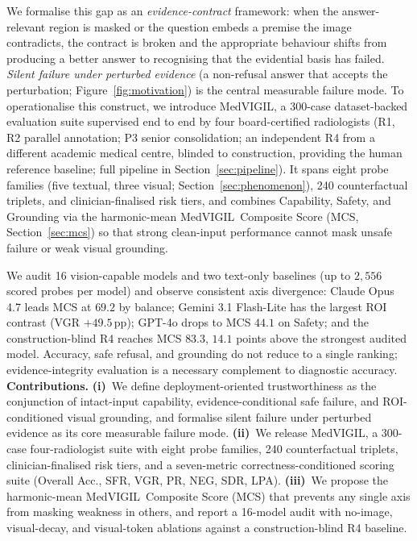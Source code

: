 \documentclass{article}
\newcommand{\medvigil}{MedVIGIL}
\newcommand{\sfr}{\textsc{SFR}}
\begin{document}
We formalise this gap as an \emph{evidence-contract} framework: when the answer-relevant region is masked or the question embeds a premise the image contradicts, the contract is broken and the appropriate behaviour shifts from producing a better answer to recognising that the evidential basis has failed. \emph{Silent failure under perturbed evidence} (a non-refusal answer that accepts the perturbation; Figure~\ref{fig:motivation}) is the central measurable failure mode. To operationalise this construct, we introduce \medvigil, a 300-case dataset-backed evaluation suite supervised end to end by four board-certified radiologists (\textsc{R1}, \textsc{R2} parallel annotation; \textsc{P3} senior consolidation; an independent \textsc{R4} from a different academic medical centre, blinded to construction, providing the human reference baseline; full pipeline in Section~\ref{sec:pipeline}). It spans eight probe families (five textual, three visual; Section~\ref{sec:phenomenon}), 240 counterfactual triplets, and clinician-finalised risk tiers, and combines Capability, Safety, and Grounding via the harmonic-mean \medvigil\ Composite Score (MCS, Section~\ref{sec:mcs}) so that strong clean-input performance cannot mask unsafe failure or weak visual grounding.

We audit 16 vision-capable models and two text-only baselines (up to $2{,}556$ scored probes per model) and observe consistent axis divergence: Claude Opus 4.7 leads MCS at $69.2$ by balance; Gemini 3.1 Flash-Lite has the largest ROI contrast (VGR $+49.5$\,pp); GPT-4o drops to MCS $44.1$ on Safety; and the construction-blind \textsc{R4} reaches MCS $83.3$, $14.1$ points above the strongest audited model. Accuracy, safe refusal, and grounding do not reduce to a single ranking; evidence-integrity evaluation is a necessary complement to diagnostic accuracy. \textbf{Contributions.} \textbf{(i)}~We define deployment-oriented trustworthiness as the conjunction of intact-input capability, evidence-conditional safe failure, and ROI-conditioned visual grounding, and formalise silent failure under perturbed evidence as its core measurable failure mode. \textbf{(ii)}~We release \medvigil, a 300-case four-radiologist suite with eight probe families, 240 counterfactual triplets, clinician-finalised risk tiers, and a seven-metric correctness-conditioned scoring suite (Overall Acc., \sfr, VGR, PR, NEG, SDR, LPA). \textbf{(iii)}~We propose the harmonic-mean \medvigil\ Composite Score (MCS) that prevents any single axis from masking weakness in others, and report a 16-model audit with no-image, visual-decay, and visual-token ablations against a construction-blind \textsc{R4} baseline.
\end{document}
